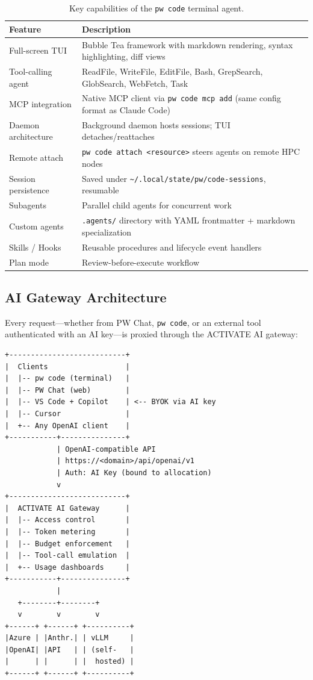 \documentclass[11pt,letterpaper,twoside]{article}
\begin{document}
\begin{table}[H]
\centering
\small
\caption{Key capabilities of the \texttt{pw code} terminal agent.}
\label{tab:pwcode}
\begin{tabularx}{\textwidth}{L{3.2cm} X}
\toprule
\textbf{Feature} & \textbf{Description} \\
\midrule
Full-screen TUI & Bubble Tea framework with markdown rendering, syntax highlighting, diff views \\
Tool-calling agent & ReadFile, WriteFile, EditFile, Bash, GrepSearch, GlobSearch, WebFetch, Task \\
MCP integration & Native MCP client via \texttt{pw code mcp add} (same config format as Claude Code) \\
Daemon architecture & Background daemon hosts sessions; TUI detaches/reattaches \\
Remote attach & \texttt{pw code attach <resource>} steers agents on remote HPC nodes \\
Session persistence & Saved under \texttt{\~{}/.local/state/pw/code-sessions}, resumable \\
Subagents & Parallel child agents for concurrent work \\
Custom agents & \texttt{.agents/} directory with YAML frontmatter + markdown specialization \\
Skills / Hooks & Reusable procedures and lifecycle event handlers \\
Plan mode & Review-before-execute workflow \\
\bottomrule
\end{tabularx}
\end{table}

\subsection{AI Gateway Architecture}

Every request---whether from PW Chat, \texttt{pw code}, or an external tool
authenticated with an AI key---is proxied through the ACTIVATE AI gateway:

\begin{lstlisting}[style=diagram]
+---------------------------+
|  Clients                  |
|  |-- pw code (terminal)   |
|  |-- PW Chat (web)        |
|  |-- VS Code + Copilot    | <-- BYOK via AI key
|  |-- Cursor               |
|  +-- Any OpenAI client    |
+-----------+---------------+
            | OpenAI-compatible API
            | https://<domain>/api/openai/v1
            | Auth: AI Key (bound to allocation)
            v
+---------------------------+
|  ACTIVATE AI Gateway      |
|  |-- Access control       |
|  |-- Token metering       |
|  |-- Budget enforcement   |
|  |-- Tool-call emulation  |
|  +-- Usage dashboards     |
+-----------+---------------+
            |
   +--------+--------+
   v        v        v
+------+ +------+ +----------+
|Azure | |Anthr.| | vLLM     |
|OpenAI| |API   | | (self-   |
|      | |      | |  hosted) |
+------+ +------+ +----------+
\end{lstlisting}
\end{document}
